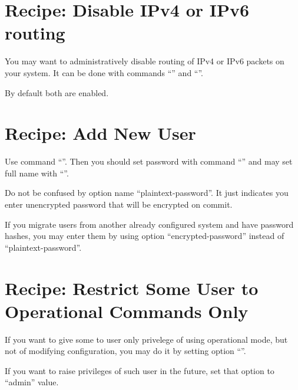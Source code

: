 \section{Recipe: Disable IPv4 or IPv6 routing}
You may want to administratively disable routing of IPv4 or IPv6 packets on your system. It can be done
with commands ``'' and ``''.

By default both are enabled.

\section{Recipe: Add New User}
\solution
Use command ``''. Then you should set password with command 
``'' and may set
full name with ``''.

Do not be confused by option name ``plaintext-password''. It just indicates you enter unencrypted password
that will be encrypted on commit. 

If you migrate users from another already configured system and have password hashes, you may
enter them by using option ``encrypted-password'' instead of ``plaintext-password''.

\section{Recipe: Restrict Some User to Operational Commands Only}
If you want to give some to user only privelege of using operational mode, but not of modifying configuration,
you may do it by setting option ``''.

If you want to raise privileges of such user in the future, set that option to ``admin'' value.